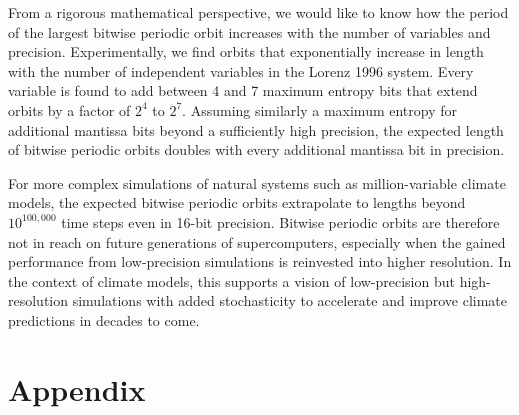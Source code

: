 From a rigorous mathematical perspective, we would like to know how the period of the largest bitwise periodic orbit increases
with the number of variables and precision. Experimentally, we find orbits that exponentially increase in length with the number
of independent variables in the Lorenz 1996 system. Every variable is found to add between 4 and 7 maximum entropy bits that
extend orbits by a factor of $2^4$ to $2^7$. Assuming similarly a maximum entropy for additional mantissa bits beyond a
sufficiently high precision, the expected length of bitwise periodic orbits doubles with every additional mantissa bit in precision.

For more complex simulations of natural systems such as million-variable climate models, the expected bitwise periodic orbits
extrapolate to lengths beyond $10^{100,000}$ time steps even in 16-bit precision. Bitwise periodic orbits are therefore not in reach
on future generations of supercomputers, especially when the gained performance from low-precision simulations is reinvested
into higher resolution. In the context of climate models, this supports a vision of low-precision but high-resolution simulations
with added stochasticity to accelerate and improve climate predictions in decades to come.

\newpage
\section{Appendix}
\label{sec:orbits_appendix}

